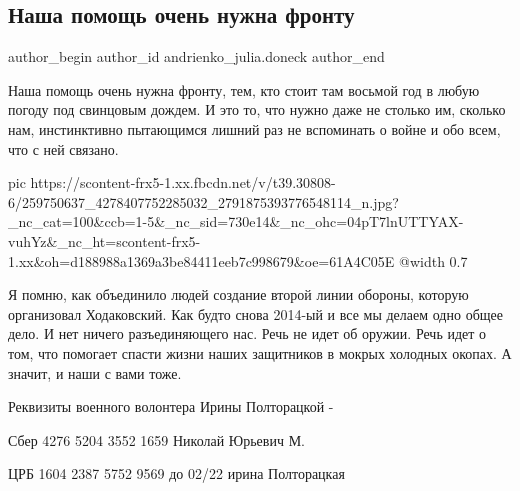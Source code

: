 
 
 
 
 
 
\subsection{Наша помощь очень нужна фронту}
\label{sec:25_11_2021.fb.andrienko_julia.doneck.1.nasha_pomosch_front}
 
\ifcmt
 author_begin
   author_id andrienko_julia.doneck
 author_end
\fi

Наша помощь очень нужна фронту, тем, кто стоит там восьмой год в любую погоду
под свинцовым дождем. И это то, что нужно даже не столько им, сколько нам,
инстинктивно пытающимся лишний раз не вспоминать о войне и обо всем, что с ней
связано. 

\ifcmt
  pic https://scontent-frx5-1.xx.fbcdn.net/v/t39.30808-6/259750637_4278407752285032_2791875393776548114_n.jpg?_nc_cat=100&ccb=1-5&_nc_sid=730e14&_nc_ohc=04pT7lnUTTYAX-vuhYz&_nc_ht=scontent-frx5-1.xx&oh=d188988a1369a3be84411eeb7c998679&oe=61A4C05E
  @width 0.7
\fi

Я помню, как объединило людей создание второй линии обороны, которую
организовал Ходаковский. Как будто снова 2014-ый и все мы делаем одно общее
дело. И нет ничего разъединяющего нас. Речь не идет об оружии. Речь идет о том,
что помогает спасти жизни наших защитников в мокрых холодных окопах. А значит,
и наши с вами тоже.

Реквизиты военного волонтера Ирины Полторацкой - 

Сбер 4276 5204 3552 1659 Николай Юрьевич М.

ЦРБ 1604 2387 5752 9569 до 02/22 ирина Полторацкая

